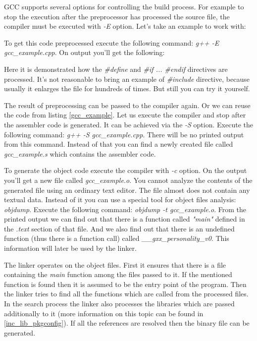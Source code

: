 GCC supports several options for controlling the build process. For example to stop the execution after the preprocessor has processed the source file, the compiler must be executed with \textit { -E} option. Let's take an example to work with: 



To get this code preprocessed execute the following command: \textit { g++ -E gcc\_example.cpp}. On output you'll get the following:



Here it is demonstrated how the \textit { \#define} and \textit { \#if ... \#endif} directives are processed. It's not reasonable to bring an example of \textit { \#include} directive, because usually it enlarges the file for hundreds of times. But still you can try it yourself.

The result of preprocessing can be passed to the compiler again. Or we can reuse the code from listing \ref{gcc_example}. Let us execute the compiler and stop after the assembler code is generated. It can be achieved via the \textit { -S} option. Execute the following command: \textit { g++ -S gcc\_example.cpp}. There will be no printed output from this command. Instead of that you can find a newly created file called \textit { gcc\_example.s} which contains the assembler code.

To generate the object code execute the compiler with \textit { -c} option. On the output you'll get a new file called \textit { gcc\_example.o}. You cannot analyze the contents of the generated file using an ordinary text editor. The file almost does not contain any textual data. Instead of it you can use a special tool for object files analysis: \textit { objdump}. Execute the following command: \textit { objdump -t gcc\_example.o}. From the printed output we can find out that there is a function called \textit { "main"} defined in the \textit { .text} section of that file. And we also find out that there is an undefined function (thus there is a function call) called \textit { \_\_gxx\_personality\_v0}. This information will later be used by the linker.

The linker operates on the object files. First it ensures that there is a file containing the \textit { main} function among the files passed to it. If the mentioned function is found then it is assumed to be the entry point of the program. Then the linker tries to find all the functions which are called from the processed files. In the search process the linker also processes the libraries which are passed additionally to it (more information on this topic can be found in \ref {inc_lib_pkgconfig}). If all the references are resolved then the binary file can be generated.

